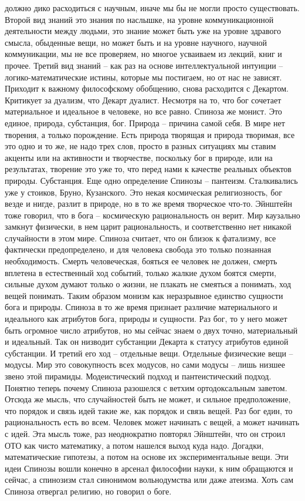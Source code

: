 \documentclass[a4paper, 12pt]{article}
\begin{document}
должно дико расходиться с научным, иначе мы бы не могли просто 
существовать. Второй вид знаний это знания по наслышке, на уровне 
коммуникационной деятельности между людьми, это знание может быть уже на 
уровне здравого смысла, обыденные вещи, но может быть и на уровне 
научного, научной коммуникации, мы не все проверяем, но многое усваиваем 
из лекций, книг и прочее. Третий вид знаний -- как раз на основе 
интеллектуальной интуиции -- логико-математические истины, которые мы 
постигаем, но от нас не зависят. Приходит к важному философскому 
обобщению, снова расходится с Декартом. Критикует за дуализм, что Декарт 
дуалист. Несмотря на то, что бог сочетает материальное и идеальное 
в человеке, но все равно. Спиноза же монист. Это единое, природа, 
субстанция, бог. Природа -- причина самой себя. В мире нет творения, 
а только порождение. Есть природа творящая и природа творимая, все это 
одно и то же, не надо трех слов, просто в разных ситуациях мы ставим 
акценты или на активности и творчестве, поскольку бог в природе, или на 
результатах, творение это уже то, что перед нами к качестве реальных 
объектов природы. Субстанция. Еще одно определение Спинозы -- пантеизм. 
Сталкивались уже у стоиков, Бруно, Кузанского. Это некая космическая 
религиозность, бог везде и нигде, разлит в природе, но в то же время 
творческое что-то. Эйнштейн тоже говорил, что в бога -- космическую 
рациональность он верит. Мир каузально замкнут физически, в нем царит 
рациональность, и соответственно нет никакой случайности в этом мире. 
Спиноза считает, что он близок к фатализму, все фактически 
предопределено, и для человека свобода это только познанная 
необходимость. Смерть человеческая, бояться ее человек не должен, смерть 
вплетена в естественный ход событий, только жалкие духом боятся смерти, 
сильные духом думают только о жизни, не плакать не смеяться а понимать, 
ход вещей понимать. Таким образом монизм как неразрывное единство 
сущности бога и природы. Спиноза в то же время признает различие 
материального и идеального как атрибутов бога, природы и сущности. Раз 
бог, то у него может быть огромное число атрибутов, но мы сейчас знаем 
о двух точно, материальный и идеальный. Так он низводит субстанции 
Декарта к статусу атрибутов единой субстанции. И третий его ход -- 
отдельные вещи. Отдельные физические вещи -- модусы. Мир это 
совокупность всех модусов, но сами модусы -- лишь низшее звено этой 
пирамиды. Модеистический подход и пантеистический подход. Понятно теперь 
почему Спиноза разошелся с ветхим ортодоксальным заветом. Отсюда же 
мысль, что случайностей быть не может, и сильное предположение, что 
порядок и связь идей такие же, как порядок и связь вещей. Раз бог един, 
то рациональность есть во всем. Человек может начинать с вещей, а может 
начинать с идей. Эта мысль тоже, раз неоднократно повторял Эйнштейн, что 
он строил ОТО как чисто математику, а потом нашелся выход куда надо. 
Догадки, математические гипотезы, а потом на основе их экспериментальные 
вещи. Эти идеи Спинозы вошли конечно в арсенал философии науки, к ним 
обращаются и сейчас, а спинозизм стал синонимом вольнодумства или даже 
атеизма. Хоть сам Спиноза отвергал религию, но говорил о боге.
\end{document}
